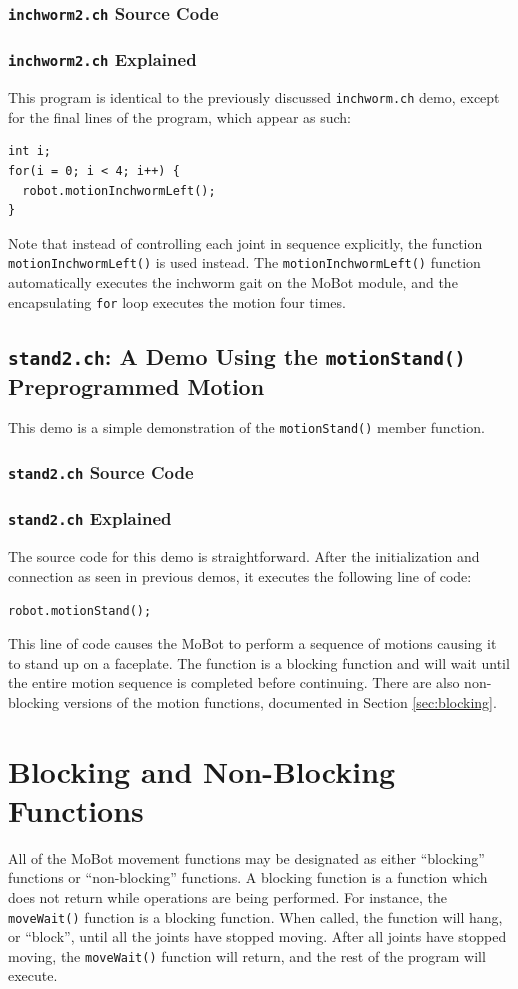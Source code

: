 \documentclass{article}
\begin{document}
\subsubsection{\texttt{inchworm2.ch} Source Code}

\subsubsection{\texttt{inchworm2.ch} Explained}
This program is identical to the previously discussed \texttt{inchworm.ch} demo,
except for the final lines of the program, which appear as such:
\begin{verbatim}
int i;
for(i = 0; i < 4; i++) {
  robot.motionInchwormLeft();
}
\end{verbatim}
Note that instead of controlling each joint in sequence explicitly, the function
\texttt{motionInchwormLeft()} is used instead. The \texttt{motionInchwormLeft()} 
function automatically executes the inchworm gait on the MoBot module, and the
encapsulating \texttt{for} loop executes the motion four times.

\subsection{\texttt{stand2.ch}: A Demo Using the \texttt{motionStand()} Preprogrammed
Motion}
This demo is a simple demonstration of the \texttt{motionStand()} member function.
\subsubsection{\texttt{stand2.ch} Source Code}

\subsubsection{\texttt{stand2.ch} Explained}
The source code for this demo is straightforward. After the initialization and 
connection as seen in previous demos, it executes the following line of
code:
\begin{verbatim}
robot.motionStand();
\end{verbatim}
This line of code causes the MoBot to perform a sequence of motions causing it to
stand up on a faceplate. The function is a blocking function and will wait until
the entire motion sequence is completed before continuing. There are also non-blocking
versions of the motion functions, documented in Section \ref{sec:blocking}.

\section{\label{sec:blocking}Blocking and Non-Blocking Functions}
All of the MoBot movement functions may be designated as either ``blocking'' 
functions or ``non-blocking'' functions. A blocking function is a function which
does not return while operations are being performed. For instance, the
\texttt{moveWait()} function is a blocking function. When called, the function
will hang, or ``block'', until all the joints have stopped moving. After all
joints have stopped moving, the \texttt{moveWait()} function will return, and 
the rest of the program will execute.
\end{document}
